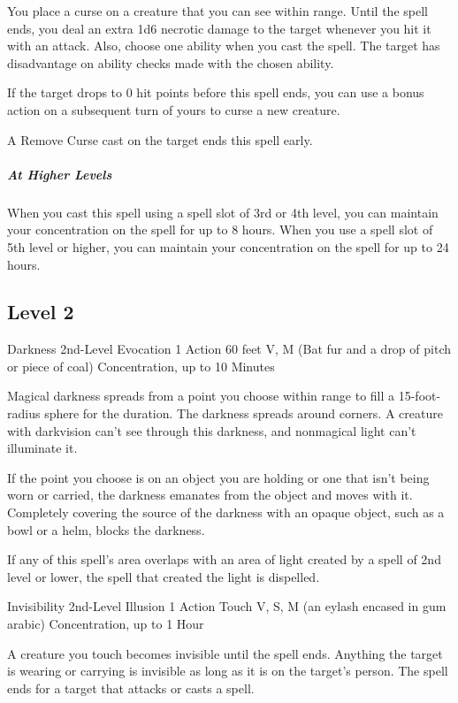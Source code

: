 {You place a curse on a creature that you can see within range. Until the spell ends, you deal an extra 1d6 necrotic damage to the target whenever you hit it with an attack. Also, choose one ability when you cast the spell. The target has disadvantage on ability checks made with the chosen ability.

If the target drops to 0 hit points before this spell ends, you can use a bonus action on a subsequent turn of yours to curse a new creature.

A Remove Curse cast on the target ends this spell early.

\subparagraph*{At Higher Levels} When you cast this spell using a spell slot of 3rd or 4th level, you can maintain your concentration on the spell for up to 8 hours. When you use a spell slot of 5th level or higher, you can maintain your concentration on the spell for up to 24 hours.

\subsection*{Level 2}

\DndSpellHeader
	{Darkness}
	{2nd-Level Evocation}
	{1 Action}
	{60 feet}
	{V, M (Bat fur and a drop of pitch or piece of coal)}
	{Concentration, up to 10 Minutes}
	
Magical darkness spreads from a point you choose within range to fill a 15-foot-radius sphere for the duration. The darkness spreads around corners. A creature with darkvision can't see through this darkness, and nonmagical light can't illuminate it.

If the point you choose is on an object you are holding or one that isn't being worn or carried, the darkness emanates from the object and moves with it. Completely covering the source of the darkness with an opaque object, such as a bowl or a helm, blocks the darkness.

If any of this spell's area overlaps with an area of light created by a spell of 2nd level or lower, the spell that created the light is dispelled.
	
\DndSpellHeader
	{Invisibility}
	{2nd-Level Illusion}
	{1 Action}
	{Touch}
	{V, S, M (an eylash encased in gum arabic)}
	{Concentration, up to 1 Hour}

A creature you touch becomes invisible until the spell ends. Anything the target is wearing or carrying is invisible as long as it is on the target's person. The spell ends for a target that attacks or casts a spell.

}
